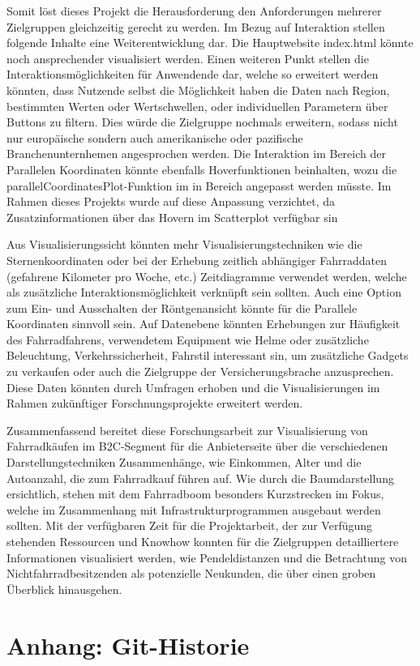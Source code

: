 \documentclass[usegeometry=true]{scrartcl}
\begin{document}
Somit löst dieses Projekt die Herausforderung den Anforderungen mehrerer Zielgruppen gleichzeitig gerecht zu werden.   
Im Bezug auf Interaktion stellen folgende Inhalte eine Weiterentwicklung dar. Die Hauptwebsite index.html könnte noch ansprechender visualisiert werden. Einen weiteren Punkt stellen die Interaktionsmöglichkeiten für Anwendende dar, welche so erweitert werden könnten, dass Nutzende selbst die Möglichkeit haben die Daten nach Region, bestimmten Werten oder Wertschwellen, oder individuellen Parametern über Buttons zu filtern. Dies würde die Zielgruppe nochmals erweitern, sodass nicht nur europäische sondern auch amerikanische oder pazifische Branchenunternhemen angesprochen werden. Die Interaktion im Bereich der Parallelen Koordinaten könnte ebenfalls Hoverfunktionen beinhalten, wozu die parallelCoordinatesPlot-Funktion im in Bereich angepasst werden müsste. Im Rahmen dieses Projekts wurde auf diese Anpassung verzichtet, da Zusatzinformationen über das Hovern im Scatterplot verfügbar sin 

Aus Visualisierungssicht könnten mehr Visualisierungstechniken wie die Sternenkoordinaten oder bei der Erhebung zeitlich abhängiger Fahrraddaten (gefahrene Kilometer pro Woche, etc.) Zeitdiagramme verwendet werden, welche als zusätzliche Interaktionsmöglichkeit verknüpft sein sollten. Auch eine Option zum Ein- und Ausschalten der Röntgenansicht könnte für die Parallele Koordinaten sinnvoll sein. 
Auf Datenebene könnten Erhebungen zur Häufigkeit des Fahrradfahrens, verwendetem Equipment wie Helme oder zusätzliche Beleuchtung, Verkehrssicherheit, Fahrstil interessant sin, um zusätzliche Gadgets zu verkaufen oder auch die Zielgruppe der Versicherungsbrache anzusprechen. Diese Daten könnten durch Umfragen erhoben und die Visualisierungen im Rahmen zukünftiger Forschnungsprojekte erweitert werden.  

Zusammenfassend bereitet diese Forschungsarbeit zur Visualisierung von Fahrradkäufen im B2C-Segment für die Anbieterseite über die verschiedenen Darstellungstechniken Zusammenhänge, wie Einkommen, Alter und die Autoanzahl, die zum Fahrradkauf führen auf. Wie durch die Baumdarstellung ersichtlich, stehen mit dem Fahrradboom besonders Kurzstrecken im Fokus, welche im Zusammenhang mit Infrastrukturprogrammen ausgebaut werden sollten. 
Mit der verfügbaren Zeit für die Projektarbeit, der zur Verfügung stehenden Ressourcen und Knowhow konnten für die Zielgruppen detailliertere Informationen visualisiert werden, wie Pendeldistanzen und die Betrachtung von Nichtfahrradbesitzenden als potenzielle Neukunden, die über einen groben Überblick hinausgehen.   


\section*{Anhang: Git-Historie}
\newpage

\end{document}
